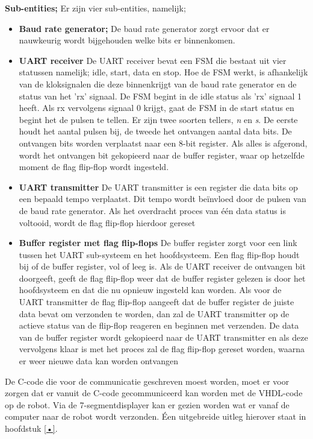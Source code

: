 \documentclass{report}
\begin{document}
\textbf{Sub-entities;}
\newline
Er zijn vier sub-entities, namelijk;

\begin{itemize}
\item  \textbf{Baud rate generator;}
\newline
De baud rate generator zorgt ervoor dat er nauwkeurig wordt bijgehouden welke bits er binnenkomen.

\item \textbf{UART receiver}
\newline 
De UART receiver bevat een FSM die bestaat uit vier statussen namelijk; idle, start, data en stop.
Hoe de FSM werkt, is afhankelijk van de kloksignalen die deze binnenkrijgt van de baud rate generator en de status van het 'rx' signaal.
De FSM begint in de idle status als 'rx' signaal 1 heeft.
Als rx vervolgens signaal 0 krijgt, gaat de FSM in de start status en begint het de pulsen te tellen.
Er zijn twee soorten tellers, \textit{n} en \textit{s}.
De eerste houdt het aantal pulsen bij, de tweede het ontvangen aantal data bits.
De ontvangen bits worden verplaatst naar een 8-bit register.
Als alles is afgerond, wordt het ontvangen bit gekopieerd naar de buffer register, waar op hetzelfde moment de flag flip-flop wordt ingesteld.
 
 \item \textbf{UART transmitter}
 \newline
 De UART transmitter is een register die data bits op een bepaald tempo verplaatst.
Dit tempo wordt beïnvloed door de pulsen van de baud rate generator.
Als het overdracht proces van één data status is voltooid, wordt de flag flip-flop hierdoor gereset
 
 \item \textbf{Buffer register met flag flip-flops}
 \newline
 De buffer register zorgt voor een link tussen het UART sub-systeem en het hoofdsysteem.
Een flag flip-flop houdt bij of de buffer register, vol of leeg is.
\newline
Als de UART receiver de ontvangen bit doorgeeft, geeft de flag flip-flop weer dat de buffer register gelezen is door het hoofdsysteem en dat die nu opnieuw ingesteld kan worden.
\newline
Als voor de UART transmitter de flag flip-flop aangeeft dat de buffer register de juiste data bevat om verzonden te worden, dan zal de UART transmitter op de actieve status van de flip-flop reageren en beginnen met verzenden.
De data van de buffer register wordt gekopieerd naar de UART transmitter en als deze vervolgens klaar is met het proces zal de flag flip-flop gereset worden, waarna er weer nieuwe data kan worden ontvangen 
 
\end{itemize}
De C-code die voor de communicatie geschreven moest worden, moet er voor zorgen dat er vanuit de C-code gecommuniceerd kan worden met de VHDL-code op de robot.
\newline
Via de 7-segmentdisplayer kan er gezien worden wat er vanaf de computer naar de robot wordt verzonden. Éen uitgebreide uitleg hierover staat in hoofdstuk \ref{•}.
\end{document}
